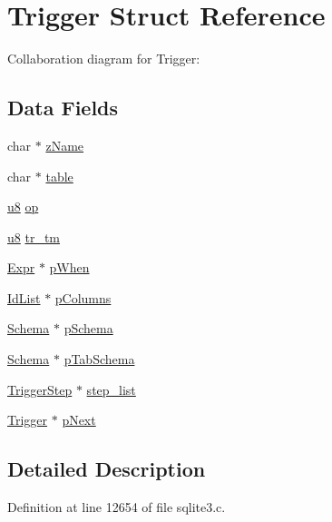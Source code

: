 \hypertarget{struct_trigger}{}\section{Trigger Struct Reference}
\label{struct_trigger}


Collaboration diagram for Trigger\+:
\subsection*{Data Fields}
\begin{DoxyCompactItemize}
\item 
char $\ast$ \hyperlink{struct_trigger_a661118d86ac4127d40bf3be78d92117d}{z\+Name}
\item 
char $\ast$ \hyperlink{struct_trigger_abc4810aa7718733bfc48b1973f4c92f8}{table}
\item 
\hyperlink{sqlite3_8c_a74a0f6424ae628af25f23f0a35f6ead3}{u8} \hyperlink{struct_trigger_a0991b29aa40e12f033237266ebe6610c}{op}
\item 
\hyperlink{sqlite3_8c_a74a0f6424ae628af25f23f0a35f6ead3}{u8} \hyperlink{struct_trigger_a98ed40aa0adcb5616ec4499aaab16f3a}{tr\+\_\+tm}
\item 
\hyperlink{struct_expr}{Expr} $\ast$ \hyperlink{struct_trigger_ab548cb17db3157472b7bcedf090a51e1}{p\+When}
\item 
\hyperlink{struct_id_list}{Id\+List} $\ast$ \hyperlink{struct_trigger_a3c7046da4f11b74f98e0611dac37d586}{p\+Columns}
\item 
\hyperlink{struct_schema}{Schema} $\ast$ \hyperlink{struct_trigger_ac262c2ca980f0326edbe82bbe7fda205}{p\+Schema}
\item 
\hyperlink{struct_schema}{Schema} $\ast$ \hyperlink{struct_trigger_a55c2d533138b9f0d4ff75efd6423c1b4}{p\+Tab\+Schema}
\item 
\hyperlink{struct_trigger_step}{Trigger\+Step} $\ast$ \hyperlink{struct_trigger_a1864547b78df5071eee17260d8dd5631}{step\+\_\+list}
\item 
\hyperlink{struct_trigger}{Trigger} $\ast$ \hyperlink{struct_trigger_a2729170b472b9b62b8c6a558d58d6819}{p\+Next}
\end{DoxyCompactItemize}


\subsection{Detailed Description}


Definition at line 12654 of file sqlite3.\+c.



